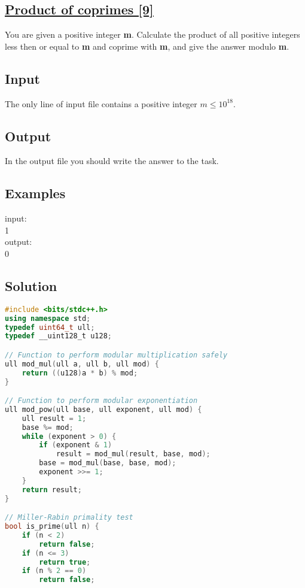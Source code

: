 \documentclass[10pt,a4paper]{article}
\begin{document}
\begin{itemize}
\subsection*{\href{https://basecamp.eolymp.com/en/problems/647}{\underline{Product of coprimes [9]}}}
You are given a positive integer \textbf{m}. Calculate the product of all positive integers less then or equal to \textbf{m} and coprime with \textbf{m}, and give the answer modulo \textbf{m}.
\subsection*{Input}
The only line of input file contains a positive integer $m \leq 10^{18}$.

\subsection*{Output}
In the output file you should write the answer to the task.

\subsection*{Examples}
input: \\
1\\
output: \\
0

\subsection*{Solution}
\begin{lstlisting}[language=C++, caption={Product of coprimes}, label={1st:code}, mathescape=true, breaklines=true]
#include <bits/stdc++.h>    
using namespace std;
typedef uint64_t ull;
typedef __uint128_t u128;

// Function to perform modular multiplication safely
ull mod_mul(ull a, ull b, ull mod) {
    return ((u128)a * b) % mod;
}

// Function to perform modular exponentiation
ull mod_pow(ull base, ull exponent, ull mod) {
    ull result = 1;
    base %= mod;
    while (exponent > 0) {
        if (exponent & 1)
            result = mod_mul(result, base, mod);
        base = mod_mul(base, base, mod);
        exponent >>= 1;
    }
    return result;
}

// Miller-Rabin primality test
bool is_prime(ull n) {
    if (n < 2)
        return false;
    if (n <= 3)
        return true;
    if (n % 2 == 0)
        return false;


\end{lstlisting}
\end{itemize}
\end{document}
